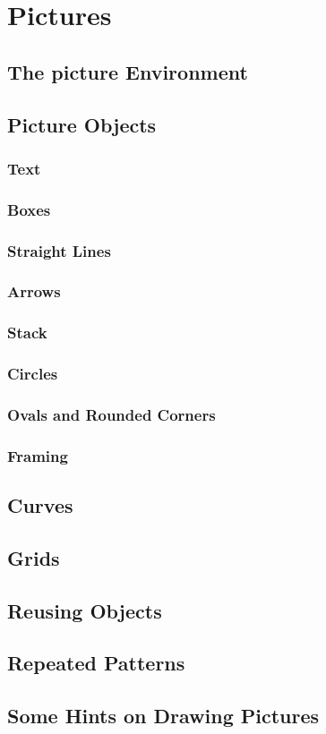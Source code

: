 \section{Pictures}
\subsection{The picture Environment}


\subsection{Picture Objects}
\subsubsection{Text}
\subsubsection{Boxes}
\subsubsection{Straight Lines}
\subsubsection{Arrows}
\subsubsection{Stack}
\subsubsection{Circles}
\subsubsection{Ovals and Rounded Corners}
\subsubsection{Framing}


\subsection{Curves}


\subsection{Grids}


\subsection{Reusing Objects}


\subsection{Repeated Patterns}


\subsection{Some Hints on Drawing Pictures}